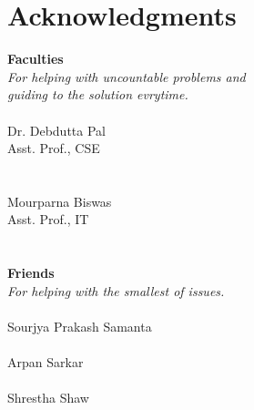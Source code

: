 \cleardoublepage
{}
{}
\chapter*{Acknowledgments}
\vspace{1.0in}
{\large \textbf{Faculties}}\\
{\small \emph{For helping with uncountable problems and\\
guiding to the solution evrytime.}}
\\
\\
Dr. Debdutta Pal \\ 
Asst. Prof., CSE\\
\\
\\
Mourparna Biswas\\
Asst. Prof., IT\\ 
\\
\\{\large \textbf{Friends}}\\
{\small \emph{For helping with the smallest of issues.}}
\\
\\
Sourjya Prakash Samanta \\ 
\\
Arpan Sarkar\\
\\
Shrestha Shaw\\

\newpage
